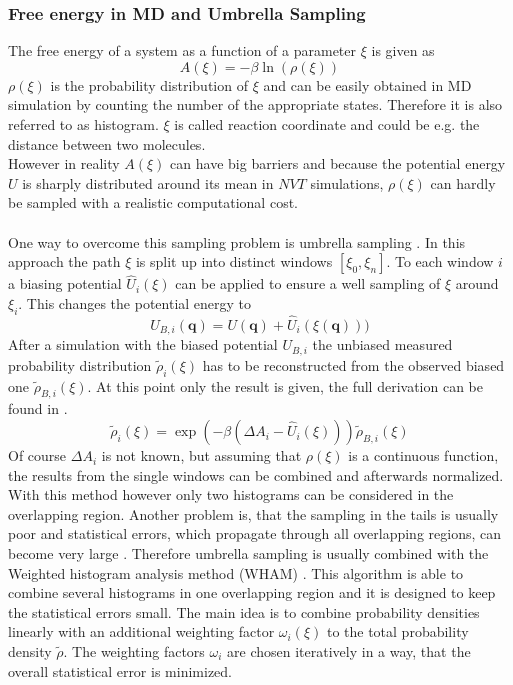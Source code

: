 \subsubsection{Free energy in MD and Umbrella Sampling}
The free energy of a system as a function of a parameter $\xi$ is given as
\begin{equation}
\label{eq:free_energy_from_rho}
A(\xi) = - \beta \ln\left(\rho(\xi)\right)
\end{equation}
$\rho(\xi)$ is the probability distribution of $\xi$ and can be easily obtained in MD simulation by counting the number of the appropriate states. Therefore it is also referred to as histogram. $\xi$ is called reaction coordinate and could be e.g. the distance between two molecules.\\
However in reality $A(\xi)$ can have big barriers and because the potential energy $U$ is sharply distributed around its mean in $NVT$ simulations, $\rho(\xi)$ can hardly be sampled with a realistic computational cost.\\
\\
One way to overcome this sampling problem is umbrella sampling \autocite{originalUmbrellaSampling}. In this approach the path $\xi$ is split up into distinct windows $[\xi_0, \xi_n]$. To each window $i$ a biasing potential $\hat{U}_i(\xi)$ can be applied to ensure a well sampling of $\xi$ around $\xi_i$. This changes the potential energy to
\begin{equation}
U_{B, i}(\mathbf{q}) = U(\mathbf{q}) + \hat{U}_i(\xi(\mathbf{q})))
\end{equation}
After a simulation with the biased potential $U_{B, i}$ the unbiased measured probability distribution $\tilde{\rho}_i(\xi)$ has to be reconstructed from the observed biased one $\tilde{\rho}_{B, i}(\xi)$. At this point only the result is given, the full derivation can be found in \textcite[p. 179ff]{UnderstandingMD}.\\
 \begin{equation}
 \label{eq:reconstruction_from_biased}
 \tilde{\rho}_{i}(\xi) = \exp\left(-\beta\left(\Delta A_i - \hat{U}_i(\xi)\right)\right)\tilde{\rho}_{B, i}(\xi)
 \end{equation}
Of course $\Delta A_i$ is not known, but assuming that $\rho(\xi)$ is a continuous function, the results from the single windows can be combined and afterwards normalized.\\
With this method however only two histograms can be considered in the overlapping region. Another problem is, that the sampling in the tails is usually poor and statistical errors, which propagate through all overlapping regions, can become very large \autocite[236ff]{freeEnergyBook}. Therefore umbrella sampling is usually combined with the Weighted histogram analysis method (WHAM) \autocites{originalWHAM, extensionWHAM}. This algorithm is able to combine several histograms in one overlapping region and it is designed to keep the statistical errors small. The main idea is to combine probability densities linearly with an additional weighting factor $\omega_i(\xi)$ to the total probability density $\tilde{\rho}$. The weighting factors $\omega_i$ are chosen iteratively in a way, that the overall statistical error is minimized.\\